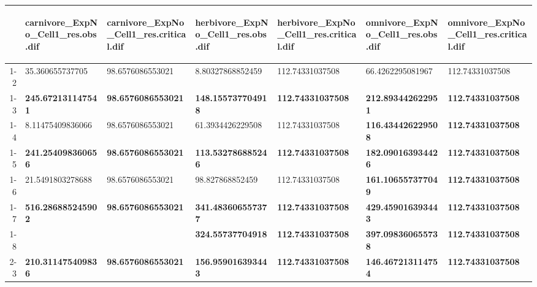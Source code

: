 \begin{table}[ht]
\centering
\begin{tabular}{rllllll}
  \toprule
 & \begin{sideways} carnivore_ExpNo_Cell1_res.obs.dif \end{sideways} & \begin{sideways} carnivore_ExpNo_Cell1_res.critical.dif \end{sideways} & \begin{sideways} herbivore_ExpNo_Cell1_res.obs.dif \end{sideways} & \begin{sideways} herbivore_ExpNo_Cell1_res.critical.dif \end{sideways} & \begin{sideways} omnivore_ExpNo_Cell1_res.obs.dif \end{sideways} & \begin{sideways} omnivore_ExpNo_Cell1_res.critical.dif \end{sideways} \\ 
  \midrule
1-2 & 35.360655737705 & 98.6576086553021 & 8.80327868852459 & 112.74331037508 & 66.4262295081967 & 112.74331037508 \\ 
  1-3 & \textbf{245.672131147541} & \textbf{98.6576086553021} & \textbf{148.155737704918} & \textbf{112.74331037508} & \textbf{212.893442622951} & \textbf{112.74331037508} \\ 
  1-4 & 8.11475409836066 & 98.6576086553021 & 61.3934426229508 & 112.74331037508 & \textbf{116.434426229508} & \textbf{112.74331037508} \\ 
  1-5 & \textbf{241.254098360656} & \textbf{98.6576086553021} & \textbf{113.532786885246} & \textbf{112.74331037508} & \textbf{182.090163934426} & \textbf{112.74331037508} \\ 
  1-6 & 21.5491803278688 & 98.6576086553021 & 98.827868852459 & 112.74331037508 & \textbf{161.106557377049} & \textbf{112.74331037508} \\ 
  1-7 & \textbf{516.286885245902} & \textbf{98.6576086553021} & \textbf{341.483606557377} & \textbf{112.74331037508} & \textbf{429.459016393443} & \textbf{112.74331037508} \\ 
  1-8 &  &  & \textbf{324.55737704918} & \textbf{112.74331037508} & \textbf{397.098360655738} & \textbf{112.74331037508} \\ 
  2-3 & \textbf{210.311475409836} & \textbf{98.6576086553021} & \textbf{156.959016393443} & \textbf{112.74331037508} & \textbf{146.467213114754} & \textbf{112.74331037508} \\ 

\end{tabular}
\end{table}

